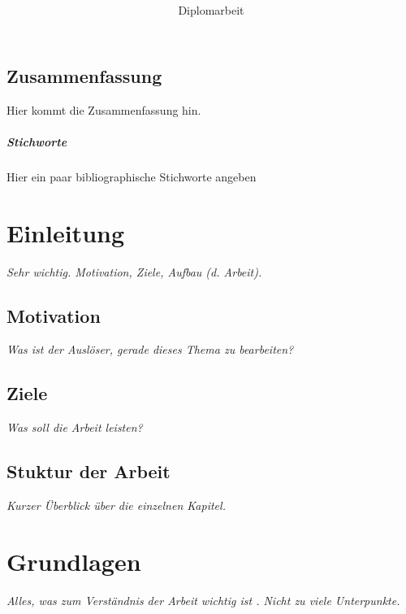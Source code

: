 \documentclass[%
  parskip=half,
  ]{scrreprt} %
\title{%
\dipltitle\\%
\bigskip\usekomafont{subtitle}%
\parbox[h]{0.8\textwidth}{\begin{center}\diplsubtitle\end{center}}%
}
\subtitle{\usekomafont{subject}\vspace{3em}Diplomarbeit}
\author{}
\date{}
\newcommand{\rem}[1]{\textcolor{remcolor}{\emph{#1}}}
\begin{document}
\ifpdf
{}
\else
{}
\fi


\maketitle

\thispagestyle{empty}
\section*{Zusammenfassung}
Hier kommt die Zusammenfassung hin.

\paragraph{Stichworte} Hier ein paar bibliographische Stichworte angeben
\tableofcontents
\listoffigures
\listoftables
\lstlistoflistings
\listofalgorithms

\clearpage


\chapter{Einleitung}
\rem{Sehr wichtig. Motivation, Ziele, Aufbau (d. Arbeit).}

\section{Motivation}
\rem{Was ist der Auslöser, gerade dieses Thema zu bearbeiten?}

\section{Ziele}
\rem{Was soll die Arbeit leisten?}

\section{Stuktur der Arbeit}
\rem{Kurzer Überblick über die einzelnen Kapitel.}

\chapter{Grundlagen}\label{chap:grundlagen}
\rem{Alles, was zum Verständnis der Arbeit wichtig ist \cite{Berners-Lee:2001a}. Nicht zu viele 
Unterpunkte.}
\end{document}
